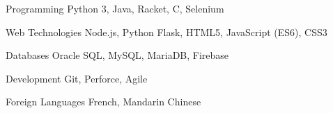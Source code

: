 

\begin{cvskills}

  \cvskill
  {Programming} %
  {Python 3, Java, Racket, C, Selenium} %

  \cvskill
  {Web Technologies} %
  {Node.js, Python Flask, HTML5, JavaScript (ES6), CSS3} %

  \cvskill
  {Databases} %
  {Oracle SQL, MySQL, MariaDB, Firebase} %

  \cvskill
  {Development} %
  {Git, Perforce, Agile} %

  \cvskill
  {Foreign Languages} %
  {French, Mandarin Chinese} %

\end{cvskills}
